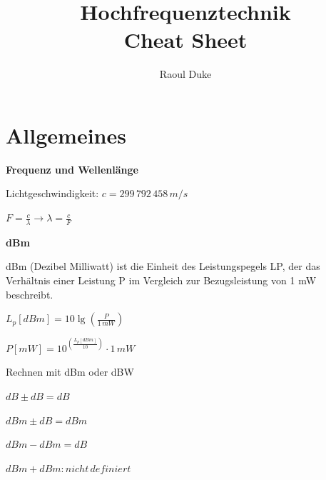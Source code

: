 \documentclass[german]{latex4ei/latex4ei_sheet}
\title{Hochfrequenztechnik \\ Cheat Sheet}
\author{Raoul Duke}
\begin{document}
\maketitle
\section{Allgemeines}
    \begin{sectionbox}{\textbf{Frequenz und Wellenlänge}}
        \item Lichtgeschwindigkeit: $c = 299\,792\,458\,m/s$
        \item $F = \frac{c}{\lambda} \rightarrow \lambda = \frac{c}{F}$
    \end{sectionbox}
    \begin{sectionbox}{\textbf{dBm}}
        \item dBm (Dezibel Milliwatt) ist die Einheit des Leistungspegels LP, der das Verhältnis einer Leistung P im Vergleich zur Bezugsleistung von 1 mW beschreibt. 
        \item $L_p[dBm] = 10\lg\left(\frac{P}{1\,mW}\right)$
        \item $P[mW] = 10^{\left(\frac{L_p[dBm]}{10}\right)}\cdot 1\,mW$
        \item \begin{symbolbox} {Rechnen mit dBm oder dBW}
            \item $dB \pm dB = dB$
            \item $dBm \pm dB = dBm$
            \item $dBm - dBm = dB$
            \item $dBm + dBm : nicht\, definiert$
        \end{symbolbox}
    \end{sectionbox}
\end{document}
